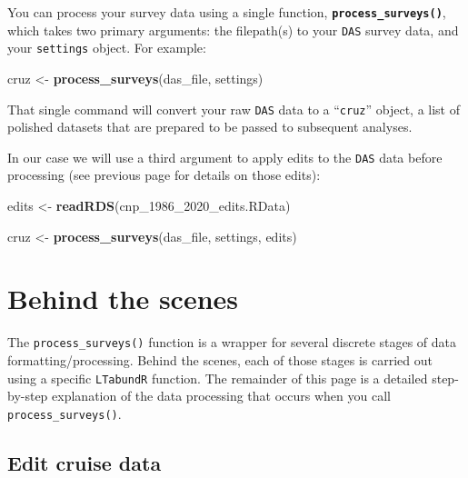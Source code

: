 \documentclass[
]{book}
\newenvironment{Shaded}{\begin{snugshade}}{\end{snugshade}}
\newcommand{\FunctionTok}[1]{\textcolor[rgb]{0.13,0.29,0.53}{\textbf{#1}}}
\newcommand{\NormalTok}[1]{#1}
\newcommand{\OtherTok}[1]{\textcolor[rgb]{0.56,0.35,0.01}{#1}}
\newcommand{\StringTok}[1]{\textcolor[rgb]{0.31,0.60,0.02}{#1}}
\begin{document}
You can process your survey data using a single function, \textbf{\texttt{process\_surveys()}}, which takes two primary arguments: the filepath(s) to your \texttt{DAS} survey data, and your \texttt{settings} object. For example:

\begin{Shaded}
\begin{Highlighting}[]
\NormalTok{cruz }\OtherTok{\textless{}{-}} \FunctionTok{process\_surveys}\NormalTok{(das\_file, }
\NormalTok{                        settings)}
\end{Highlighting}
\end{Shaded}

That single command will convert your raw \texttt{DAS} data to a ``\texttt{cruz}'' object, a list of polished datasets that are prepared to be passed to subsequent analyses.

In our case we will use a third argument to apply edits to the \texttt{DAS} data before processing (see previous page for details on those edits):

\begin{Shaded}
\begin{Highlighting}[]
\NormalTok{edits }\OtherTok{\textless{}{-}} \FunctionTok{readRDS}\NormalTok{(}\StringTok{\textquotesingle{}cnp\_1986\_2020\_edits.RData\textquotesingle{}}\NormalTok{)}

\NormalTok{cruz }\OtherTok{\textless{}{-}} \FunctionTok{process\_surveys}\NormalTok{(das\_file, }
\NormalTok{                        settings,}
\NormalTok{                        edits)}
\end{Highlighting}
\end{Shaded}

\hypertarget{behind-the-scenes}{%
\section*{Behind the scenes}\label{behind-the-scenes}}

The \texttt{process\_surveys()} function is a wrapper for several discrete stages of data formatting/processing. Behind the scenes, each of those stages is carried out using a specific \texttt{LTabundR} function. The remainder of this page is a detailed step-by-step explanation of the data processing that occurs when you call \texttt{process\_surveys()}.

\hypertarget{edit-cruise-data}{%
\subsection*{Edit cruise data}\label{edit-cruise-data}}
\end{document}
